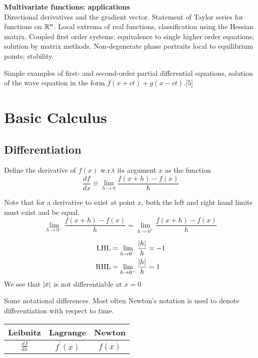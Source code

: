 \documentclass{article}
\begin{document}
{    \vspace{10pt}
    \noindent\textbf{Multivariate functions: applications}\\
    Directional derivatives and the gradient vector. Statement of Taylor series for functions on $\mathbb{R}^n$. Local extrema of real functions, classification using the Hessian matrix. Coupled first order systems: equivalence to single higher order equations; solution by matrix methods. Non-degenerate phase portraits local to equilibrium points; stability.
    
    \vspace{5pt}
    \noindent Simple examples of first- and second-order partial differential equations, solution of the wave equation in the form $f(x + ct) + g(x - ct)$.\hspace*{\fill}[5]}

\tableofcontents

\section{Basic Calculus}
\subsection{Differentiation}
\begin{defi}
    Define the derivative of $f(x)$ w.r.t its argument $x$ as the function
    \[
        \frac{df}{dx} \equiv \lim_{h \rightarrow 0}{\frac{f(x +h) - f(x)}{h}}
    \]


    Note that for a derivative to exist at point $x$, both the left and right hand limits must exist and be equal. 
    \[
        \lim_{h \rightarrow 0^-}{\frac{f(x +h) - f(x)}{h}} = \lim_{h \rightarrow 0^+}{\frac{f(x +h) - f(x)}{h}}
    \]
\end{defi}

\begin{eg}[$f(x) = \abs{x}$]
    \begin{align*}
        \text{LHL} &= \lim_{h \rightarrow 0^-}{\frac{\left\lvert h\right\rvert}{h}} = -1 \\
        \text{RHL} &= \lim_{h \rightarrow 0^-}{\frac{\left\lvert h\right\rvert}{h}} = 1
    \end{align*}
    We see that $\left\lvert x\right\rvert$ is not differentiable at $x=0$
\end{eg}

Some notational differences. Most often Newton's notation is used to denote differentiation with respect to time. 
\begin{center}
    \begin{tabular}{ c|c|c }    
        Leibnitz & Lagrange & Newton \\
        \midrule
        $\frac{df}{dx}$ & $f^{\prime}(x)$ & $\dot{f}(x)$
    \end{tabular}
\end{center}
\end{document}
